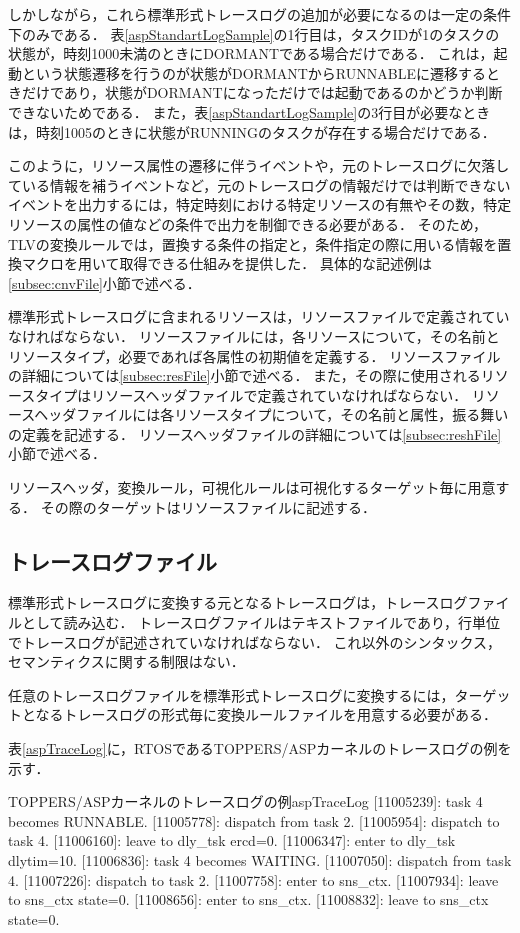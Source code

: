 しかしながら，これら標準形式トレースログの追加が必要になるのは一定の条件下のみである．
表\ref{aspStandartLogSample}の1行目は，タスクIDが1のタスクの状態が，時刻1000未満のときにDORMANTである場合だけである．
これは，起動という状態遷移を行うのが状態がDORMANTからRUNNABLEに遷移するときだけであり，状態がDORMANTになっただけでは起動であるのかどうか判断できないためである．
また，表\ref{aspStandartLogSample}の3行目が必要なときは，時刻1005のときに状態がRUNNINGのタスクが存在する場合だけである．

このように，リソース属性の遷移に伴うイベントや，元のトレースログに欠落している情報を補うイベントなど，元のトレースログの情報だけでは判断できないイベントを出力するには，特定時刻における特定リソースの有無やその数，特定リソースの属性の値などの条件で出力を制御できる必要がある．
そのため，TLVの変換ルールでは，置換する条件の指定と，条件指定の際に用いる情報を置換マクロを用いて取得できる仕組みを提供した．
具体的な記述例は\ref{subsec:cnvFile}小節で述べる．

標準形式トレースログに含まれるリソースは，リソースファイルで定義されていなければならない．
リソースファイルには，各リソースについて，その名前とリソースタイプ，必要であれば各属性の初期値を定義する．
リソースファイルの詳細については\ref{subsec:resFile}小節で述べる．
また，その際に使用されるリソースタイプはリソースヘッダファイルで定義されていなければならない．
リソースヘッダファイルには各リソースタイプについて，その名前と属性，振る舞いの定義を記述する．
リソースヘッダファイルの詳細については\ref{subsec:reshFile}小節で述べる．

リソースヘッダ，変換ルール，可視化ルールは可視化するターゲット毎に用意する．
その際のターゲットはリソースファイルに記述する．

\subsection{トレースログファイル}

標準形式トレースログに変換する元となるトレースログは，トレースログファイルとして読み込む．
トレースログファイルはテキストファイルであり，行単位でトレースログが記述されていなければならない．
これ以外のシンタックス，セマンティクスに関する制限はない．

任意のトレースログファイルを標準形式トレースログに変換するには，ターゲットとなるトレースログの形式毎に変換ルールファイルを用意する必要がある．

表\ref{aspTraceLog}に，RTOSであるTOPPERS/ASPカーネルのトレースログの例を示す．

\begin{File}{TOPPERS/ASPカーネルのトレースログの例}{aspTraceLog}
[11005239]: task 4 becomes RUNNABLE.
[11005778]: dispatch from task 2.
[11005954]: dispatch to task 4.
[11006160]: leave to dly_tsk ercd=0.
[11006347]: enter to dly_tsk dlytim=10.
[11006836]: task 4 becomes WAITING.
[11007050]: dispatch from task 4.
[11007226]: dispatch to task 2.
[11007758]: enter to sns_ctx.
[11007934]: leave to sns_ctx state=0.
[11008656]: enter to sns_ctx.
[11008832]: leave to sns_ctx state=0.
\end{File}

